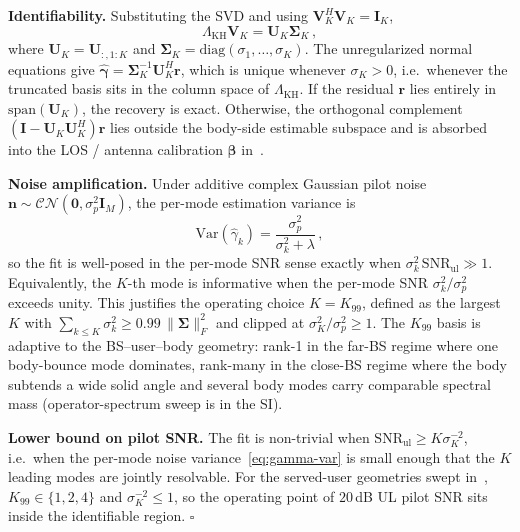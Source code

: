 \documentclass[journal,twocolumn,10pt]{IEEEtran}
\theoremstyle{plain}
\theoremstyle{definition}
\theoremstyle{remark}
\newcommand{\betab}{\bm{\beta}}
\newcommand{\gammab}{\bm{\gamma}}
\begin{document}
\textbf{Identifiability.} Substituting the SVD and using
$\bm{V}_K^{\!H}\bm{V}_K = \bm{I}_K$,
\begin{equation}\label{eq:Fb-Vk}
  \Lambda_{\mathrm{KH}}\bm{V}_K = \bm{U}_K\bm{\Sigma}_K\,,
\end{equation}
where $\bm{U}_K = \bm{U}_{:,1:K}$ and
$\bm{\Sigma}_K = \mathrm{diag}(\sigma_1,\dots,\sigma_K)$. The
unregularized normal equations give
$\hat{\gammab} = \bm{\Sigma}_K^{-1}\bm{U}_K^{\!H}\bm{r}$, which is
unique whenever $\sigma_K > 0$, i.e.~whenever the truncated basis
sits in the column space of $\Lambda_{\mathrm{KH}}$. If the residual
$\bm{r}$ lies entirely in $\mathrm{span}(\bm{U}_K)$, the recovery is
exact. Otherwise, the orthogonal complement
$(\bm{I}-\bm{U}_K\bm{U}_K^{\!H})\bm{r}$ lies outside
the body-side estimable subspace and is absorbed into the
LOS / antenna calibration $\betab$ in~.

\textbf{Noise amplification.} Under additive complex Gaussian pilot
noise $\bm{n} \sim \mathcal{CN}(\bm{0},\sigma_p^2 \bm{I}_M)$,
the per-mode estimation variance is
\begin{equation}\label{eq:gamma-var}
  \mathrm{Var}(\hat\gamma_k)
    = \frac{\sigma_p^2}{\sigma_k^2 + \lambda}\,,
\end{equation}
so the fit is well-posed in the per-mode SNR
sense exactly when $\sigma_k^2 \,\mathrm{SNR}_{\mathrm{ul}}\gg 1$.
Equivalently, the $K$-th mode is informative when the per-mode SNR
$\sigma_k^2/\sigma_p^2$ exceeds unity. This justifies the operating
choice $K = K_{99}$, defined as the largest $K$ with
$\sum_{k\leq K}\sigma_k^2 \geq 0.99\,\|\bm{\Sigma}\|_F^2$ and
clipped at $\sigma_K^2 / \sigma_p^2 \geq 1$. The $K_{99}$ basis is
adaptive to the BS--user--body geometry: rank-1 in the far-BS regime
where one body-bounce mode dominates, rank-many in the close-BS
regime where the body subtends a wide solid angle and several body
modes carry comparable spectral mass (operator-spectrum sweep is in
the SI).

\textbf{Lower bound on pilot SNR.} The fit is non-trivial when
$\mathrm{SNR}_{\mathrm{ul}} \geq K\sigma_K^{-2}$, i.e.~when the
per-mode noise variance~\eqref{eq:gamma-var} is small enough that
the $K$ leading modes are jointly resolvable. For the served-user
geometries swept in~, $K_{99} \in \{1,2,4\}$
and $\sigma_K^{-2} \leq 1$, so the operating point of
$20\,$dB UL pilot SNR sits inside the identifiable
region. \hfill$\square$
\end{document}
